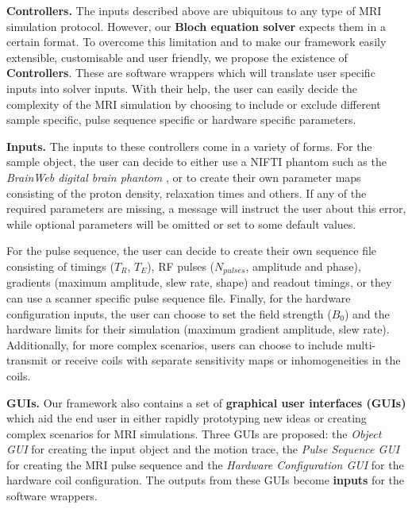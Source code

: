 \hfill

\textbf{Controllers.} The inputs described above are ubiquitous to any type of MRI simulation protocol.
However, our \textbf{Bloch equation solver} expects them in a certain format.
To overcome this limitation and to make our framework easily extensible, customisable and user friendly, we propose the existence of \textbf{Controllers}.
These are software wrappers which will translate user specific inputs into solver inputs.
With their help, the user can easily decide the complexity of the MRI simulation by choosing to include or exclude different sample specific, pulse sequence specific or hardware specific parameters.

\hfill

\textbf{Inputs.} The inputs to these controllers come in a variety of forms. 
For the sample object, the user can decide to either use a NIFTI phantom such as the \textit{BrainWeb digital brain phantom} \cite{Kwan1997}, or to create their own parameter maps consisting of the proton density, relaxation times and others.
If any of the required parameters are missing, a message will instruct the user about this error, while optional parameters will be omitted or set to some default values.

\hfill

For the pulse sequence, the user can decide to create their own sequence file consisting of timings ($T_R$, $T_E$), RF pulses ($N_{pulses}$, amplitude and phase), gradients (maximum amplitude, slew rate, shape) and readout timings, or they can use a scanner specific pulse sequence file.
Finally, for the hardware configuration inputs, the user can choose to set the field strength ($B_0$) and the hardware limits for their simulation (maximum gradient amplitude, slew rate).
Additionally, for more complex scenarios, users can choose to include multi- transmit or receive coils with separate sensitivity maps or inhomogeneities in the coils.

\hfill

\textbf{GUIs. } Our framework also contains a set of \textbf{graphical user interfaces (GUIs)} which aid the end user in either rapidly prototyping new ideas or creating complex scenarios for MRI simulations.
Three GUIs are proposed: 
the \textit{Object GUI} for creating the input object and the motion trace,
the \textit{Pulse Sequence GUI} for creating the MRI pulse sequence and 
the \textit{Hardware Configuration GUI} for the hardware coil configuration.
The outputs from these GUIs become \textbf{inputs} for the software wrappers.

